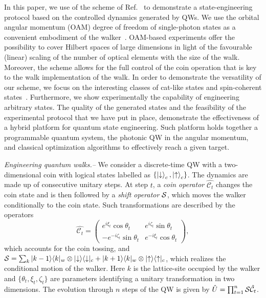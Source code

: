 In this paper, we use of the scheme of Ref.~\cite{innocenti2017quantum} to demonstrate a state-engineering protocol based on the controlled dynamics generated by \acp{QW}. We use the orbital angular momentum (OAM) degree of freedom of single-photon states as a convenient embodiment of the walker~\cite{zhang2010implementation,goyal2013implementing,cardano2015quantum}. OAM-based experiments offer the possibility to cover Hilbert spaces of large dimensions in light of the favourable (linear) scaling of the number of optical elements with the size of the walk. Moreover, the scheme allows for the full control of the coin operation that is key to the walk implementation of the walk. In order to demonstrate the versatility of our scheme, we focus on the interesting classes of cat-like states and spin-coherent states~\cite{brune1992manipulation,monroe1996schrodinger}. Furthermore, we show experimentally the capability of engineering arbitrary states.
The quality of the generated states and the feasibility of the experimental protocol that we have put in place, demonstrate the effectiveness of a hybrid platform for quantum state engineering. Such platform holds together a programmable quantum system, the photonic \ac{QW} in the angular momentum, and classical optimization algorithms to effectively reach a given target. 

\textit{Engineering quantum walks.--}
We consider a discrete-time \ac{QW} with a two-dimensional coin with logical states labelled as $\{\ket{\downarrow}_c, \ket{{\uparrow}}_c\}$. The dynamics are made up of consecutive unitary steps. At step $t$, a \emph{coin operator} $\hat{\mathcal{C}_{t}}$ changes the coin state and is then followed by a \emph{shift operator} ${\mathcal{S}}$, which moves the walker conditionally to the coin state. Such transformations are described by the operators
\begin{equation}
\hat{\mathcal{C}_t}=
\left(
\begin{array}{ll}
e^{i \xi_t} \cos{\theta_t} &  e^{i \zeta_t} \sin{\theta_t} \\
-e^{-i \zeta_t} \sin{\theta_t} & e^{-i \xi_t} \cos{\theta_t}
\end{array}
\right),
\label{coinExpr}
\end{equation}
which accounts for the coin tossing, and
${\mathcal{S}}=\sum_k |k-1\rangle \langle k|_w\otimes |{\downarrow}\rangle \langle {\downarrow}|_c+ |k+1\rangle \langle k|_w\otimes |{\uparrow}\rangle \langle{\uparrow}|_c$,
which realizes the conditional motion of the walker. Here $k$ is the lattice-site occupied by the walker and $\{\theta_t,\xi_t,\zeta_t \}$ are parameters identifying a unitary transformation in two dimensions. The evolution through $n$ steps of the {QW} is given by $\hat{U}=\prod_{t=1}^n {\mathcal{S}}\hat{{\mathcal{C}}_t}$.

